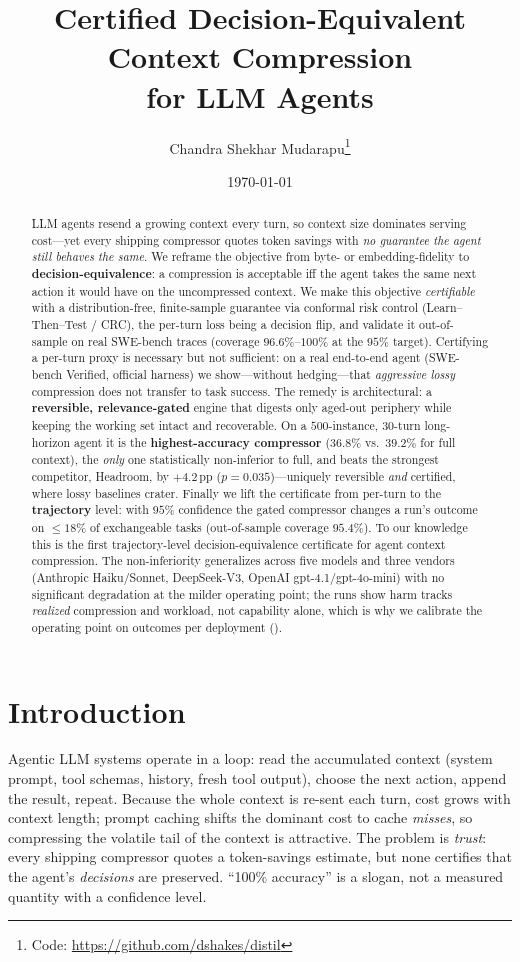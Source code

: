 \documentclass{article}
\title{\textbf{Certified Decision-Equivalent Context Compression\\ for LLM Agents}}
\author{%
  Chandra Shekhar Mudarapu\thanks{Code: \url{https://github.com/dshakes/distil}}
}
\date{\today}
\begin{document}
\maketitle

\begin{abstract}
LLM agents resend a growing context every turn, so context size dominates serving cost---yet
every shipping compressor quotes token savings with \emph{no guarantee the agent still behaves
the same}. We reframe the objective from byte- or embedding-fidelity to
\textbf{decision-equivalence}: a compression is acceptable iff the agent takes the same next
action it would have on the uncompressed context. We make this objective \emph{certifiable}
with a distribution-free, finite-sample guarantee via conformal risk control
(Learn--Then--Test / CRC), the per-turn loss being a decision flip, and validate it
out-of-sample on real SWE-bench traces (coverage $96.6\%$--$100\%$ at the $95\%$ target).
Certifying a per-turn proxy is necessary but not sufficient: on a real end-to-end agent
(SWE-bench Verified, official harness) we show---without hedging---that \emph{aggressive lossy}
compression does not transfer to task success. The remedy is architectural: a
\textbf{reversible, relevance-gated} engine that digests only aged-out periphery while keeping
the working set intact and recoverable. On a $500$-instance, $30$-turn long-horizon agent it is
the \textbf{highest-accuracy compressor} ($36.8\%$ vs.\ $39.2\%$ for full context), the
\emph{only} one statistically non-inferior to full, and beats the strongest competitor,
Headroom, by $+4.2$\,pp ($p\!=\!0.035$)---uniquely reversible \emph{and} certified, where lossy
baselines crater. Finally we lift the certificate from per-turn to the \textbf{trajectory}
level: with $95\%$ confidence the gated compressor changes a run's outcome on $\le\!18\%$ of
exchangeable tasks (out-of-sample coverage $95.4\%$). To our knowledge this is the first
trajectory-level decision-equivalence certificate for agent context compression. The
non-inferiority generalizes across five models and three vendors (Anthropic Haiku/Sonnet,
DeepSeek-V3, OpenAI gpt-4.1/gpt-4o-mini) with no significant degradation at the milder operating
point; the runs show harm tracks \emph{realized} compression and workload, not capability alone,
which is why we calibrate the operating point on outcomes per deployment ().
\end{abstract}

\section{Introduction}
Agentic LLM systems operate in a loop: read the accumulated context (system prompt,
tool schemas, history, fresh tool output), choose the next action, append the
result, repeat. Because the whole context is re-sent each turn, cost grows with
context length; prompt caching shifts the dominant cost to cache \emph{misses}, so
compressing the volatile tail of the context is attractive. The problem is
\emph{trust}: every shipping compressor quotes a token-savings estimate, but none
certifies that the agent's \emph{decisions} are preserved. ``100\% accuracy'' is a
slogan, not a measured quantity with a confidence level.
\end{document}
